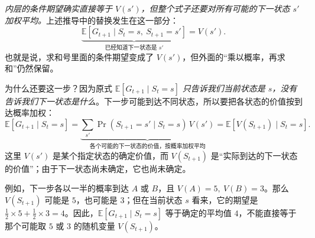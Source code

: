 \documentclass[UTF8,12pt,a4paper,fontset=fandol]{ctexart}
\begin{document}
\emph{内层的条件期望确实直接等于 \(V(s')\)，但整个式子还要对所有可能的下一状态 \(s'\) 加权平均。}上述推导中的替换发生在这一部分：
\[
\underbrace{\mathbb E[G_{t+1}\mid S_t=s,\ S_{t+1}=s']}_{\text{已经知道下一状态是 }s'}
=V(s').
\]
也就是说，求和号里面的条件期望变成了 \(V(s')\)，但外面的“乘以概率，再求和”仍然保留。

为什么还要这一步？因为原式 \(\mathbb E[G_{t+1}\mid S_t=s]\) \emph{只告诉我们当前状态是 \(s\)，没有告诉我们下一状态是什么}。下一步可能到达不同状态，所以要把各状态的价值按到达概率加权：
\[
\mathbb E[G_{t+1}\mid S_t=s]
=
\underbrace{\sum_{s'}\Pr(S_{t+1}=s'\mid S_t=s)\,V(s')}_{\text{各个可能的下一状态的价值，按概率加权平均}}
=
\mathbb E[V(S_{t+1})\mid S_t=s].
\]
这里 \(V(s')\) 是某个指定状态的确定价值，而 \(V(S_{t+1})\) 是“实际到达的下一状态的价值”；由于下一状态尚未确定，它也尚未确定。

例如，下一步各以一半的概率到达 \(A\) 或 \(B\)，且 \(V(A)=5,\ V(B)=3\)。那么 \(V(S_{t+1})\) 可能是 \(5\)，也可能是 \(3\)；但在当前状态 \(s\) 看来，它的期望是 \(\tfrac12\times5+\tfrac12\times3=4\)。因此，\(\mathbb E[G_{t+1}\mid S_t=s]\) 等于确定的平均值 \(4\)，不能直接等于那个可能取 \(5\) 或 \(3\) 的随机变量 \(V(S_{t+1})\)。
\end{document}

